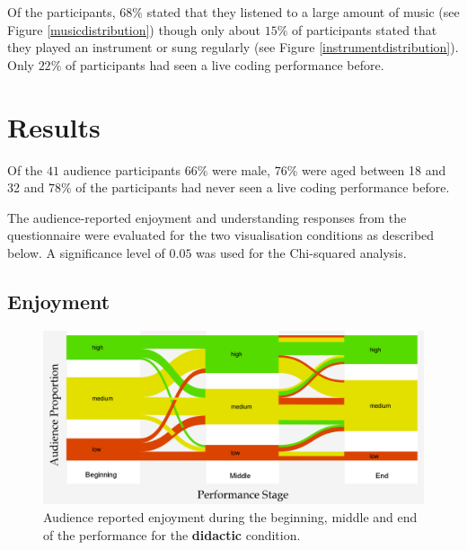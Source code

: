 Of the participants, $68\%$ stated that they listened to a large amount of music (see Figure \ref{musicdistribution}) though only about $15\%$ of participants stated that they played an instrument or sung regularly (see Figure \ref{instrumentdistribution}). Only $22\%$ of participants had seen a live coding performance before.

\section{Results}

Of the $41$ audience participants $66\%$ were male, $76\%$ were aged
between 18 and 32 and $78\%$ of the participants had never seen a live
coding performance before.

The audience-reported enjoyment and understanding responses from the
questionnaire were evaluated for the two visualisation conditions as
described below. A significance level of $0.05$ was used for the
Chi-squared analysis.

\subsection{Enjoyment}

\begin{figure}
\centering
\includegraphics[width=\columnwidth]{../study-2/results/graphs/didactic-enjoyment-final}
\caption{Audience reported enjoyment during the beginning, middle and
  end of the performance for the \textbf{didactic} condition.}
\label{fig:didactic-enjoyment}
\end{figure}

